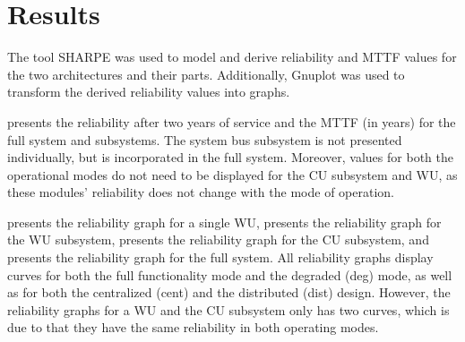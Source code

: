 \newpage
\section{Results}
\label{S4}
The tool SHARPE \cite{sharpe} was used to model and derive reliability and MTTF values for the two architectures and their parts. Additionally, Gnuplot \cite{gnuplot} was used to transform the derived reliability values into graphs.

 presents the reliability after two years of service and the MTTF (in years) for the full system and subsystems. The system bus subsystem is not presented individually, but is  incorporated in the full system. Moreover, values for both the operational modes do not need to be displayed for the CU subsystem and WU, as these modules' reliability does not change with the mode of operation.

\begin{table}[H]
\centering
\caption{The table presents the reliability after four years of service and the MTTF (years) for several units.}
\label{tab:res}
\end{table}
 presents the reliability graph for a single WU,  presents the reliability graph for the WU subsystem,  presents the reliability graph for the CU subsystem, and  presents the reliability graph for the full system. All reliability graphs display curves for both the full functionality mode and the degraded (deg) mode, as well as for both the centralized (cent) and the distributed (dist) design. However, the reliability graphs for a WU and the CU subsystem only has two curves, which is due to that they have the same reliability in both operating modes. 

